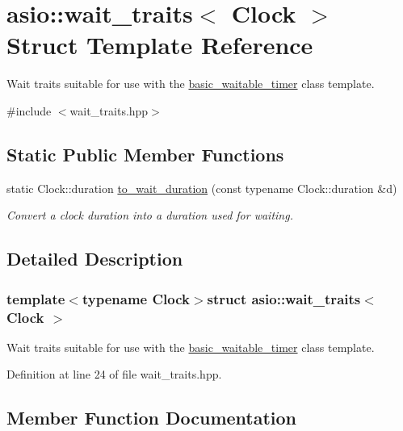 \hypertarget{structasio_1_1wait__traits}{}\section{asio\+:\+:wait\+\_\+traits$<$ Clock $>$ Struct Template Reference}
\label{structasio_1_1wait__traits}


Wait traits suitable for use with the \hyperlink{classasio_1_1basic__waitable__timer}{basic\+\_\+waitable\+\_\+timer} class template.  




{\ttfamily \#include $<$wait\+\_\+traits.\+hpp$>$}

\subsection*{Static Public Member Functions}
\begin{DoxyCompactItemize}
\item 
static Clock\+::duration \hyperlink{structasio_1_1wait__traits_a4f9aab5eb455822363961e7597de0dd2}{to\+\_\+wait\+\_\+duration} (const typename Clock\+::duration \&d)
\begin{DoxyCompactList}\small\item\em Convert a clock duration into a duration used for waiting. \end{DoxyCompactList}\end{DoxyCompactItemize}


\subsection{Detailed Description}
\subsubsection*{template$<$typename Clock$>$struct asio\+::wait\+\_\+traits$<$ Clock $>$}

Wait traits suitable for use with the \hyperlink{classasio_1_1basic__waitable__timer}{basic\+\_\+waitable\+\_\+timer} class template. 

Definition at line 24 of file wait\+\_\+traits.\+hpp.



\subsection{Member Function Documentation}
\hypertarget{structasio_1_1wait__traits_a4f9aab5eb455822363961e7597de0dd2}{}
